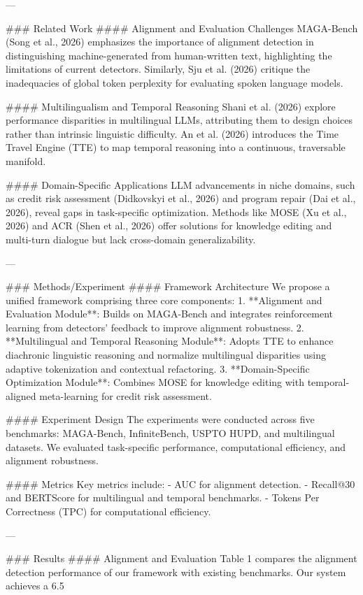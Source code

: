 ---

### Related Work
#### Alignment and Evaluation Challenges
MAGA-Bench (Song et al., 2026) emphasizes the importance of alignment detection in distinguishing machine-generated from human-written text, highlighting the limitations of current detectors. Similarly, Sju et al. (2026) critique the inadequacies of global token perplexity for evaluating spoken language models.

#### Multilingualism and Temporal Reasoning
Shani et al. (2026) explore performance disparities in multilingual LLMs, attributing them to design choices rather than intrinsic linguistic difficulty. An et al. (2026) introduces the Time Travel Engine (TTE) to map temporal reasoning into a continuous, traversable manifold.

#### Domain-Specific Applications
LLM advancements in niche domains, such as credit risk assessment (Didkovskyi et al., 2026) and program repair (Dai et al., 2026), reveal gaps in task-specific optimization. Methods like MOSE (Xu et al., 2026) and ACR (Shen et al., 2026) offer solutions for knowledge editing and multi-turn dialogue but lack cross-domain generalizability.

---

### Methods/Experiment
#### Framework Architecture
We propose a unified framework comprising three core components:
1. **Alignment and Evaluation Module**: Builds on MAGA-Bench and integrates reinforcement learning from detectors' feedback to improve alignment robustness.
2. **Multilingual and Temporal Reasoning Module**: Adopts TTE to enhance diachronic linguistic reasoning and normalize multilingual disparities using adaptive tokenization and contextual refactoring.
3. **Domain-Specific Optimization Module**: Combines MOSE for knowledge editing with temporal-aligned meta-learning for credit risk assessment.

#### Experiment Design
The experiments were conducted across five benchmarks: MAGA-Bench, InfiniteBench, USPTO HUPD, and multilingual datasets. We evaluated task-specific performance, computational efficiency, and alignment robustness.

#### Metrics
Key metrics include:
- AUC for alignment detection.
- Recall@30 and BERTScore for multilingual and temporal benchmarks.
- Tokens Per Correctness (TPC) for computational efficiency.

---

### Results
#### Alignment and Evaluation
Table 1 compares the alignment detection performance of our framework with existing benchmarks. Our system achieves a 6.5%


